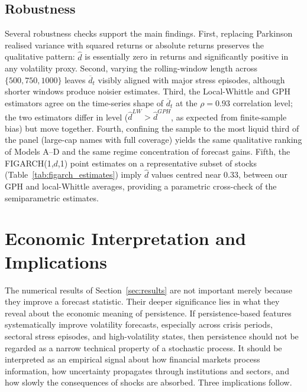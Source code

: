 \documentclass[11pt,a4paper]{article}
\newcommand{\dhat}{\hat d}
\begin{document}


\subsection{Robustness}

Several robustness checks support the main findings. First, replacing
Parkinson realised variance with squared returns or absolute returns
preserves the qualitative pattern: $\dhat$ is essentially zero in
returns and significantly positive in any volatility proxy. Second,
varying the rolling-window length across $\{500,750,1000\}$ leaves
$\overline d_t$ visibly aligned with major stress episodes, although
shorter windows produce noisier estimates. Third, the Local-Whittle and
GPH estimators agree on the time-series shape of $\overline d_t$ at the
$\rho=0.93$ correlation level; the two estimators differ in level
($\dhat^{LW}>\dhat^{GPH}$, as expected from finite-sample bias) but
move together. Fourth, confining the sample to the most liquid third of
the panel (large-cap names with full coverage) yields the same
qualitative ranking of Models A--D and the same regime concentration
of forecast gains. Fifth, the FIGARCH(1,$d$,1) point estimates on a
representative subset of stocks (Table~\ref{tab:figarch_estimates})
imply $\dhat$ values centred near $0.33$, between our GPH and
local-Whittle averages, providing a parametric cross-check of the
semiparametric estimates.

\section{Economic Interpretation and Implications}
\label{sec:economic}

The numerical results of Section~\ref{sec:results} are not important
merely because they improve a forecast statistic. Their deeper
significance lies in what they reveal about the economic meaning of
persistence. If persistence-based features systematically improve
volatility forecasts, especially across crisis periods, sectoral stress
episodes, and high-volatility states, then persistence should not be
regarded as a narrow technical property of a stochastic process. It
should be interpreted as an empirical signal about how financial markets
process information, how uncertainty propagates through institutions and
sectors, and how slowly the consequences of shocks are absorbed. Three
implications follow.
\end{document}
